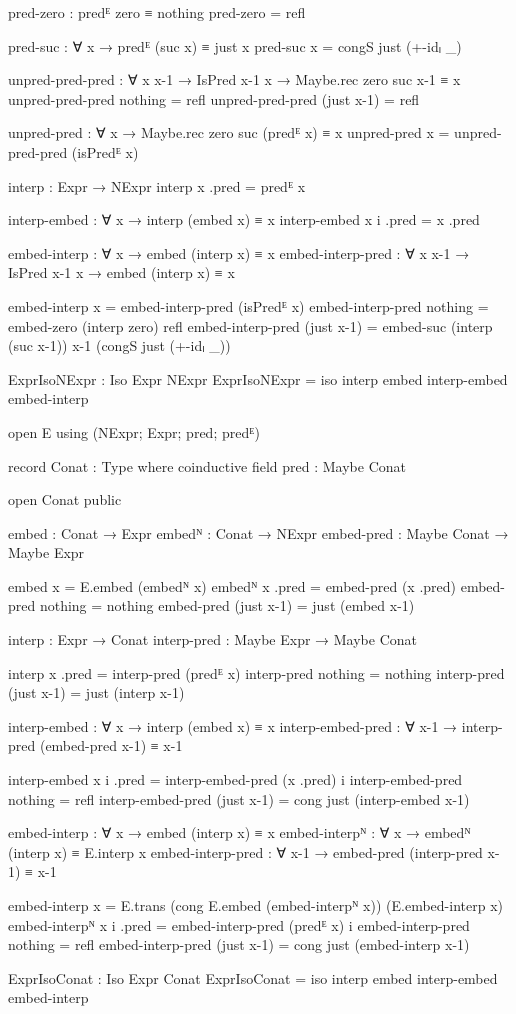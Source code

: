 \begin{code}[hide]
  pred-zero : predᴱ zero ≡ nothing
  pred-zero = refl

  pred-suc : ∀ x → predᴱ (suc x) ≡ just x
  pred-suc x = congS just (+-idₗ _)

  unpred-pred-pred : ∀ {x x-1} → IsPred x-1 x → Maybe.rec zero suc x-1 ≡ x
  unpred-pred-pred nothing = refl
  unpred-pred-pred (just x-1) = refl

  unpred-pred : ∀ x → Maybe.rec zero suc (predᴱ x) ≡ x
  unpred-pred x = unpred-pred-pred (isPredᴱ x)

  interp : Expr → NExpr
  interp x .pred = predᴱ x

  interp-embed : ∀ x → interp (embed x) ≡ x
  interp-embed x i .pred = x .pred

  embed-interp : ∀ x → embed (interp x) ≡ x
  embed-interp-pred : ∀ {x x-1} → IsPred x-1 x → embed (interp x) ≡ x

  embed-interp x = embed-interp-pred (isPredᴱ x)
  embed-interp-pred nothing = embed-zero (interp zero) refl
  embed-interp-pred (just x-1) =
    embed-suc (interp (suc x-1)) x-1 (congS just (+-idₗ _))

  ExprIsoNExpr : Iso Expr NExpr
  ExprIsoNExpr = iso interp embed interp-embed embed-interp

open E using (NExpr; Expr; pred; predᴱ)

record Conat : Type where
  coinductive
  field pred : Maybe Conat

open Conat public

embed : Conat → Expr
embedᴺ : Conat → NExpr
embed-pred : Maybe Conat → Maybe Expr

embed x = E.embed (embedᴺ x)
embedᴺ x .pred = embed-pred (x .pred)
embed-pred nothing = nothing
embed-pred (just x-1) = just (embed x-1)

interp : Expr → Conat
interp-pred : Maybe Expr → Maybe Conat

interp x .pred = interp-pred (predᴱ x)
interp-pred nothing = nothing
interp-pred (just x-1) = just (interp x-1)

interp-embed : ∀ x → interp (embed x) ≡ x
interp-embed-pred : ∀ x-1 → interp-pred (embed-pred x-1) ≡ x-1

interp-embed x i .pred = interp-embed-pred (x .pred) i
interp-embed-pred nothing = refl
interp-embed-pred (just x-1) = cong just (interp-embed x-1)

embed-interp : ∀ x → embed (interp x) ≡ x
embed-interpᴺ : ∀ x → embedᴺ (interp x) ≡ E.interp x
embed-interp-pred : ∀ x-1 → embed-pred (interp-pred x-1) ≡ x-1

embed-interp x = E.trans (cong E.embed (embed-interpᴺ x)) (E.embed-interp x)
embed-interpᴺ x i .pred = embed-interp-pred (predᴱ x) i
embed-interp-pred nothing = refl
embed-interp-pred (just x-1) = cong just (embed-interp x-1)

ExprIsoConat : Iso Expr Conat
ExprIsoConat = iso interp embed interp-embed embed-interp
\end{code}
